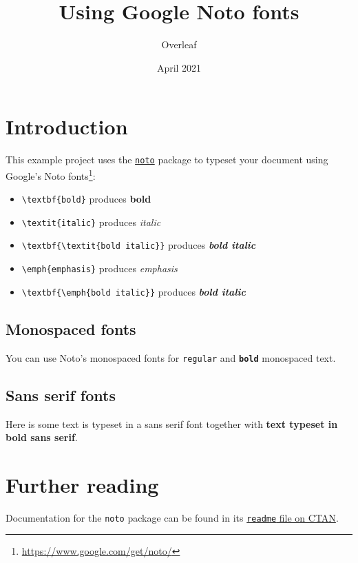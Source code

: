 \documentclass{article}
\title{Using Google Noto fonts}
\author{Overleaf}
\date{April 2021}
\begin{document}
	
	\maketitle
	
	\section{Introduction}
	This example project uses the \href{https://ctan.org/pkg/noto?lang=en}{\color{blue}\texttt{noto}} package to typeset your document using Google's Noto fonts\footnote{\url{https://www.google.com/get/noto/}}:
	\begin{itemize}
		\item \verb|\textbf{bold}| produces \textbf{bold}
		\item \verb|\textit{italic}| produces \textit{italic}
		\item \verb|\textbf{\textit{bold italic}}| produces \textbf{\textit{bold italic}}
		\item \verb|\emph{emphasis}| produces \emph{emphasis}
		\item \verb|\textbf{\emph{bold italic}}| produces \textbf{\emph{bold italic}}
	\end{itemize}
	
	\subsection{Monospaced fonts}
	You can use Noto's monospaced fonts for \texttt{regular} and \texttt{\textbf{bold}} monospaced text.
	
	\subsection{Sans serif fonts}
	Here is some \textsf{text is typeset in a sans serif font} together with \textbf{\textsf{text typeset in bold sans serif}}.
	
	\section{Further reading}
	Documentation for the \texttt{noto} package can be found in its \href{http://mirrors.ctan.org/fonts/noto/README}{\color{blue}\texttt{readme} file on CTAN}.
	
\end{document}
